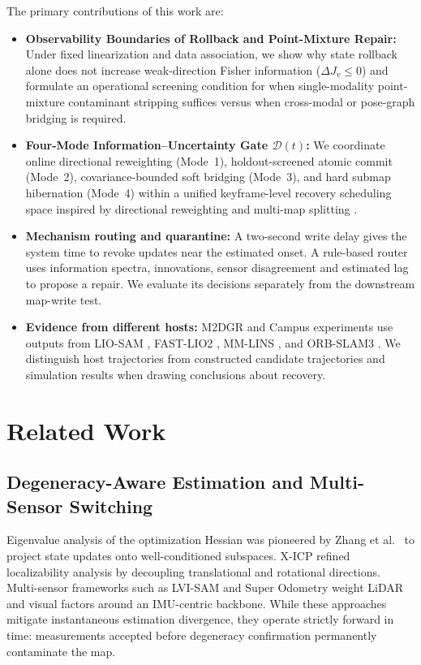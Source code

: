 \documentclass[journal]{IEEEtran}
\begin{document}
The primary contributions of this work are:
\begin{itemize}
    \item \textbf{Observability Boundaries of Rollback and Point-Mixture Repair:} Under fixed linearization and data association, we show why state rollback alone does not increase weak-direction Fisher information ($\Delta J_v \le 0$) and formulate an operational screening condition for when single-modality point-mixture contaminant stripping suffices versus when cross-modal or pose-graph bridging is required.
    \item \textbf{Four-Mode Information--Uncertainty Gate $\mathcal{D}(t)$:} We coordinate online directional reweighting (Mode~1), holdout-screened atomic commit (Mode~2), covariance-bounded soft bridging (Mode~3), and hard submap hibernation (Mode~4) within a unified keyframe-level recovery scheduling space inspired by directional reweighting \cite{zhang2016degeneracy} and multi-map splitting \cite{ma2025mmlins,campos2021orbslam3}.
    \item \textbf{Mechanism routing and quarantine:} A two-second write delay gives the system time to revoke updates near the estimated onset. A rule-based router uses information spectra, innovations, sensor disagreement and estimated lag to propose a repair. We evaluate its decisions separately from the downstream map-write test.
    \item \textbf{Evidence from different hosts:} M2DGR and Campus experiments use outputs from LIO-SAM \cite{shan2020liosam}, FAST-LIO2 \cite{xu2022fastlio2}, MM-LINS \cite{ma2025mmlins}, and ORB-SLAM3 \cite{campos2021orbslam3}. We distinguish host trajectories from constructed candidate trajectories and simulation results when drawing conclusions about recovery.
\end{itemize}

\section{Related Work}
\subsection{Degeneracy-Aware Estimation and Multi-Sensor Switching}
Eigenvalue analysis of the optimization Hessian was pioneered by Zhang et al.\ \cite{zhang2016degeneracy} to project state updates onto well-conditioned subspaces. X-ICP \cite{tuna2024xicp} refined localizability analysis by decoupling translational and rotational directions. Multi-sensor frameworks such as LVI-SAM \cite{shan2021lvisam} and Super Odometry \cite{zhao2021super} weight LiDAR and visual factors around an IMU-centric backbone. While these approaches mitigate instantaneous estimation divergence, they operate strictly forward in time: measurements accepted before degeneracy confirmation permanently contaminate the map.
\end{document}

